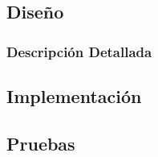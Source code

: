 \documentclass[12pt,a4paper,onecolumn,oneside]{report}
\begin{document}



\subsection{Diseño}



\subsubsection{Descripción Detallada}
\label{diseño detallado}



\subsection{Implementación}


\subsection{Pruebas}
\end{document}

